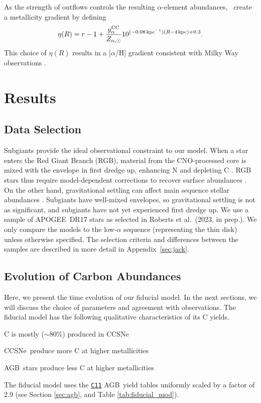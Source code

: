 \documentclass[fleqn,usenatbib]{mnras}
\newcommand{\JJ}{\citetalias{james+21}}
\newcommand{\citetjack}{Roberts et al.~(2023, in prep.)}
\newcommand{\cxi}{\texttt{\hyperlink{C11}{C11}}}
\newcommand{\agb}{AGB}
\newcommand{\apogee}{APOGEE}
\newcommand{\cc}{CCSNe}
\newcommand{\about}[1]{${\sim} #1$}
\begin{document}
As the strength of outflows controls the resulting $\alpha$-element abundances, \JJ~create a metallicity gradient by defining
\begin{equation}\label{eq:eta_r}
\eta(R) = r - 1 + \frac{y_{\alpha}^{\rm CC}}{Z_{\alpha, \odot}} 10^{(-0.08\,\text{kpc}^{-1})(R-4\,\text{kpc})+0.3}.
\end{equation}
This choice of $\eta(R)$ results in a [$\alpha$/H] gradient consistent with Milky Way observations \citep[e.g.][]{hayden+14, weinberg+19, frinchaboy+13}.


\section{Results}
\subsection{Data Selection}


Subgiants provide the ideal observational constraint to our model. 
When a star enters the Red Giant Branch (RGB), material from the CNO-processed core is mixed with the envelope in first dredge up, enhancing N and depleting C \citep{iben67, vincenzo+21,KL14}. RGB stars thus require model-dependent corrections to recover surface abundances \citep[e.g.][]{vincenzo+21}. On the other hand, gravitational settling can affect main sequence stellar abundances \citep[e.g.][]{souto19}. Subgiants have well-mixed envelopes, so gravitational settling is not as significant, and subgiants have not yet experienced first dredge up. We use a sample of \apogee\ DR17 stars \citep{apogee17} as selected in \citetjack. We only compare the models to the low-$\alpha$ sequence (representing the thin disk) unless otherwise specified.  The selection criteria and differences between the samples are described in more detail in Appendix~\ref{sec:jack}.



\subsection{Evolution of Carbon Abundances}

Here, we present the time evolution of our fiducial model. In the next sections, we will discuss the choice of parameters and agreement with observations. 
The fiducial model has the following qualitative characteristics of its C yields.
\begin{description}
    \item C is mostly (\about{80\%}) produced in \cc
    \item \cc\ produce more C at higher metallicities
    \item \agb\ stars produce less C at higher metallicities 
\end{description} 
The fiducial model uses the \cxi{} \agb\ yield tables uniformly scaled by a factor of 2.9 (see Section \ref{sec:agb}, and Table \ref{tab:fiducial_mod}). 
\end{document}
